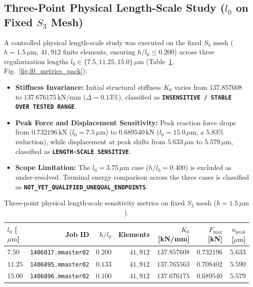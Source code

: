 \clearpage

\subsection{Three-Point Physical Length-Scale Study ($l_0$ on Fixed $S_3$ Mesh)}
A controlled physical length-scale study was executed on the fixed $S_3$ mesh ($h = 1.5\,\mu\mathrm{m}$, $41{,}912$ finite elements, ensuring $h/l_0 \le 0.200$) across three regularization lengths $l_0 \in \{7.5, 11.25, 15.0\}\,\mu\mathrm{m}$ (Table~\ref{tab:l0_study_pack}, Fig.~\ref{fig:l0_metrics_pack}):
\begin{itemize}
  \item \textbf{Stiffness Invariance:} Initial structural stiffness $K_0$ varies from $137.857608$ to $137.676175\,\mathrm{kN/mm}$ ($\Delta = 0.13\%$), classified as \textbf{\texttt{INSENSITIVE / STABLE OVER TESTED RANGE}}.
  \item \textbf{Peak Force and Displacement Sensitivity:} Peak reaction force drops from $0.732196\,\mathrm{kN}$ ($l_0 = 7.5\,\mu\mathrm{m}$) to $0.689540\,\mathrm{kN}$ ($l_0 = 15.0\,\mu\mathrm{m}$, a $5.83\%$ reduction), while displacement at peak shifts from $5.633\,\mu\mathrm{m}$ to $5.579\,\mu\mathrm{m}$, classified as \textbf{\texttt{LENGTH-SCALE SENSITIVE}}.
  \item \textbf{Scope Limitation:} The $l_0 = 3.75\,\mu\mathrm{m}$ case ($h/l_0 = 0.400$) is excluded as under-resolved. Terminal energy comparison across the three cases is classified as \textbf{\texttt{NOT\_YET\_QUALIFIED\_UNEQUAL\_ENDPOINTS}}.
\end{itemize}

\begin{table}[htbp]
\centering
\caption{Three-point physical length-scale sensitivity metrics on fixed $S_3$ mesh ($h = 1.5\,\mu\mathrm{m}$).}
\label{tab:l0_study_pack}
\small
\begin{tabular}{lrrrrrr}
\toprule
$l_0$ [$\mu\mathrm{m}$] & Job ID & $h/l_0$ & Elements & $K_0$ [kN/mm] & $F_{\max}$ [kN] & $u_{\mathrm{peak}}$ [$\mu\mathrm{m}$] \\
\midrule
$7.50$ & \texttt{1406017.mmaster02} & $0.200$ & $41{,}912$ & $137.857608$ & $0.732196$ & $5.633$ \\
$11.25$ & \texttt{1406895.mmaster02} & $0.133$ & $41{,}912$ & $137.765563$ & $0.708402$ & $5.590$ \\
$15.00$ & \texttt{1406896.mmaster02} & $0.100$ & $41{,}912$ & $137.676175$ & $0.689540$ & $5.579$ \\
\bottomrule
\end{tabular}
\end{table}

